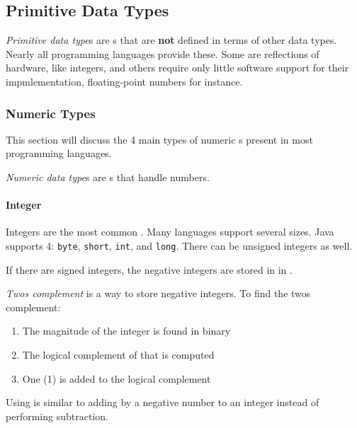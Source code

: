 \subsection{Primitive Data Types}\label{subsec:Primitive_Data_Types}
\begin{definition}\label{def:Primitive_Data_Type}
  \emph{Primitive data type}s are s that are \textbf{not} defined in terms of other data types.
  Nearly all programming languages provide these.
  Some are reflections of hardware, like integers, and others require only little software support for their impmlementation, floating-point numbers for instance.
\end{definition}

\subsubsection{Numeric Types}\label{subsubsec:Numeric_Primitive_Data_Types}
This section will discuss the 4 main types of numeric s present in most programming languages.

\begin{definition}\label{def:Numeric_Data_Type}
  \emph{Numeric data type}s are s that handle numbers.
\end{definition}

\paragraph{Integer}\label{par:Integer_Numeric_Primitive_Data_Type}
Integers are the most common .
Many languages support several sizes.
Java supports 4: \texttt{byte}, \texttt{short}, \texttt{int}, and \texttt{long}.
There can be unsigned integers as well.

If there are signed integers, the negative integers are stored in  in .
\begin{definition}\label{def:Integer_Twos_Complement}
  \emph{Twos complement} is a way to store negative integers.
  To find the twos complement:
  \begin{enumerate}[noitemsep]
  \item The magnitude of the integer is found in binary
  \item The logical complement of that is computed
  \item One (1) is added to the logical complement
  \end{enumerate}
  
  \begin{remark}
    Using  is similar to adding by a negative number to an integer instead of performing subtraction.
  \end{remark}
\end{definition}

